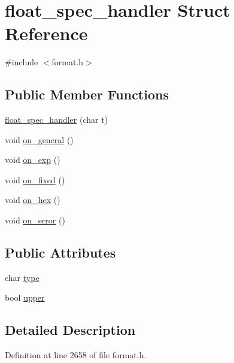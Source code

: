 \hypertarget{structfloat__spec__handler}{}\section{float\+\_\+spec\+\_\+handler Struct Reference}
\label{structfloat__spec__handler}


{\ttfamily \#include $<$format.\+h$>$}

\subsection*{Public Member Functions}
\begin{DoxyCompactItemize}
\item 
\hyperlink{structfloat__spec__handler_aa36cb1bcbe552cb7963783f813dffbdf}{float\+\_\+spec\+\_\+handler} (char t)
\item 
void \hyperlink{structfloat__spec__handler_abd032dc4969c1a554a99e1ac135207c6}{on\+\_\+general} ()
\item 
void \hyperlink{structfloat__spec__handler_aaee6f6903f2c45237cc8d5aba15582a3}{on\+\_\+exp} ()
\item 
void \hyperlink{structfloat__spec__handler_a439e537fbd78405b834e778601738953}{on\+\_\+fixed} ()
\item 
void \hyperlink{structfloat__spec__handler_a8b325fa3b35de93839ac52e0c10269e6}{on\+\_\+hex} ()
\item 
void \hyperlink{structfloat__spec__handler_ae7ee9d59f1624b0cc52fe767a5ef96bf}{on\+\_\+error} ()
\end{DoxyCompactItemize}
\subsection*{Public Attributes}
\begin{DoxyCompactItemize}
\item 
char \hyperlink{structfloat__spec__handler_aed24f3ada1700983c75e34e69ebdf25c}{type}
\item 
bool \hyperlink{structfloat__spec__handler_ad4dce31d14a3d6b4bdd2c9bc2a1f1ecc}{upper}
\end{DoxyCompactItemize}


\subsection{Detailed Description}


Definition at line 2658 of file format.\+h.



